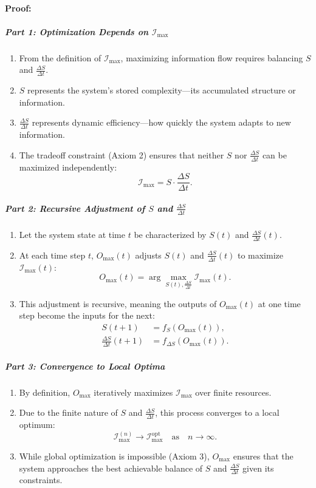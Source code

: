 \documentclass[12pt]{article}
\begin{document}
\paragraph{Proof:}

\subparagraph{Part 1: Optimization Depends on \(\mathcal{I}_{\text{max}}\)}
\begin{enumerate}
    \item From the definition of \(\mathcal{I}_{\text{max}}\), maximizing information flow requires balancing \(S\) and \(\frac{\Delta S}{\Delta t}\).
    \item \(S\) represents the system's stored complexity—its accumulated structure or information.
    \item \(\frac{\Delta S}{\Delta t}\) represents dynamic efficiency—how quickly the system adapts to new information.
    \item The tradeoff constraint (Axiom 2) ensures that neither \(S\) nor \(\frac{\Delta S}{\Delta t}\) can be maximized independently:
    \[
    \mathcal{I}_{\text{max}} = S \cdot \frac{\Delta S}{\Delta t}.
    \]
\end{enumerate}

\subparagraph{Part 2: Recursive Adjustment of \(S\) and \(\frac{\Delta S}{\Delta t}\)}
\begin{enumerate}
    \item Let the system state at time \(t\) be characterized by \(S(t)\) and \(\frac{\Delta S}{\Delta t}(t)\).
    \item At each time step \(t\), \(O_{\text{max}}(t)\) adjusts \(S(t)\) and \(\frac{\Delta S}{\Delta t}(t)\) to maximize \(\mathcal{I}_{\text{max}}(t)\):
    \[
    O_{\text{max}}(t) = \arg \max_{S(t), \frac{\Delta S}{\Delta t}} \mathcal{I}_{\text{max}}(t).
    \]
    \item This adjustment is recursive, meaning the outputs of \(O_{\text{max}}(t)\) at one time step become the inputs for the next:
    \[
    \begin{aligned}
    S(t+1) &= f_S(O_{\text{max}}(t)), \\
    \frac{\Delta S}{\Delta t}(t+1) &= f_{\Delta S}(O_{\text{max}}(t)).
    \end{aligned}
    \]
\end{enumerate}


\subparagraph{Part 3: Convergence to Local Optima}
\begin{enumerate}
    \item By definition, \(O_{\text{max}}\) iteratively maximizes \(\mathcal{I}_{\text{max}}\) over finite resources.
    \item Due to the finite nature of \(S\) and \(\frac{\Delta S}{\Delta t}\), this process converges to a local optimum:
    \[
    \mathcal{I}_{\text{max}}^{(n)} \to \mathcal{I}_{\text{max}}^{\text{opt}} \quad \text{as} \quad n \to \infty.
    \]
    \item While global optimization is impossible (Axiom 3), \(O_{\text{max}}\) ensures that the system approaches the best achievable balance of \(S\) and \(\frac{\Delta S}{\Delta t}\) given its constraints.
\end{enumerate}
\end{document}
